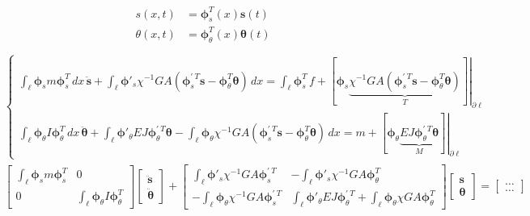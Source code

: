 \documentclass[letterpaper,10pt,english]{jupyterBook}
\begin{document}
\begin{equation*}
\begin{split}\begin{aligned}
  s(x,t) & = \boldsymbol\phi_s^T(x) \mathbf{s}(t) \\
  \theta(x,t) & = \boldsymbol\phi_\theta^T(x) \boldsymbol{\theta}(t) \\
\end{aligned}\end{split}
\end{equation*}\begin{equation*}
\begin{split}\begin{cases}
  \int_{\ell} \boldsymbol\phi_s m \boldsymbol\phi_s^T \, dx \, \ddot{\mathbf{s}} + \int_{\ell} \boldsymbol\phi'_s \chi^{-1} GA \left( \boldsymbol\phi_s^{' \ T} \mathbf{s} - \boldsymbol\phi^T_\theta \boldsymbol\theta \right) \, dx = \int_{\ell} \boldsymbol\phi^T_s \, f + \left.\left[ \boldsymbol\phi_s  \underbrace{ \chi^{-1}GA( \boldsymbol\phi^{' \ T}_s \mathbf{s} - \boldsymbol\phi^T_\theta \boldsymbol\theta) }_{T} \right]\right|_{\partial \ell} \\
    \int_{\ell} \boldsymbol\phi_\theta I \boldsymbol\phi_\theta^T \, dx \, \ddot{\boldsymbol{\theta}} + \int_{\ell} \boldsymbol\phi'_\theta EJ \boldsymbol\phi_\theta^{' \ T} \boldsymbol{\theta} - \int_{\ell} \boldsymbol\phi_\theta \chi^{-1} GA \left( \boldsymbol\phi^{' \ T}_s \mathbf{s} - \boldsymbol\phi^T_\theta \boldsymbol\theta \right)\, dx = m + \left.\left[ \boldsymbol\phi_\theta  \underbrace{ EJ \boldsymbol\phi^{' \ T}_\theta \boldsymbol{\theta} }_{M} \right]\right|_{\partial \ell}
\end{cases}\end{split}
\end{equation*}\begin{equation*}
\begin{split}\begin{bmatrix} \int_{\ell} \boldsymbol\phi_s m \boldsymbol\phi_s^T & 0 \\ 0 & \int_{\ell} \boldsymbol\phi_\theta I \boldsymbol\phi_\theta^T \end{bmatrix}\begin{bmatrix} \ddot{\mathbf{s}} \\ \ddot{\boldsymbol{\theta}} \end{bmatrix} + \begin{bmatrix} \int_{\ell} \boldsymbol\phi'_s \chi^{-1} GA \boldsymbol\phi_s^{' \ T} & -\int_{\ell} \boldsymbol\phi'_s \chi^{-1} GA \boldsymbol\phi_\theta^{T} \\  -\int_{\ell} \boldsymbol\phi_\theta \chi^{-1} GA \boldsymbol\phi_s^{' \ T} & \int_{\ell} \boldsymbol\phi'_\theta EJ \boldsymbol\phi_\theta^{' \ T} + \int_{\ell} \boldsymbol\phi_\theta \chi GA \boldsymbol\phi_\theta^{T} \end{bmatrix}\begin{bmatrix} \mathbf{s} \\ \boldsymbol{\theta} \end{bmatrix} = \begin{bmatrix} \dots \\ \dots \end{bmatrix}\end{split}
\end{equation*}
\end{document}
